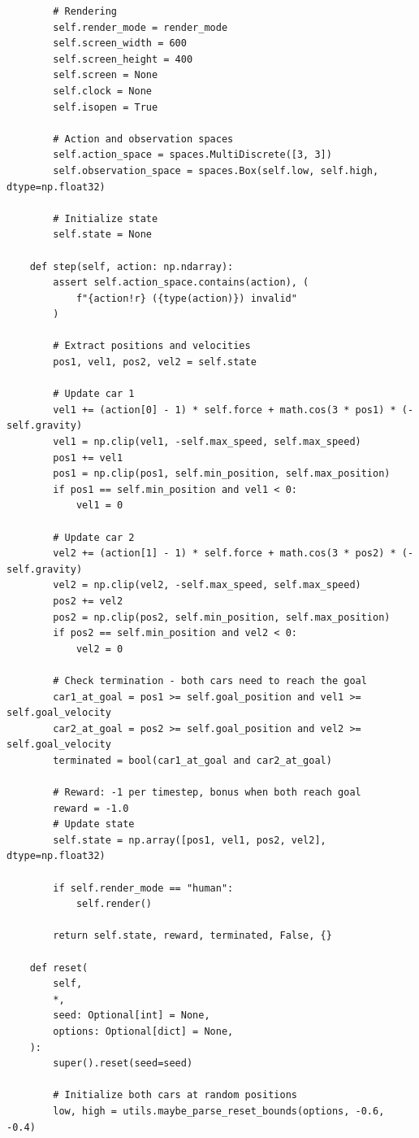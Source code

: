 \documentclass[citestyle=gb7714-2015, bibstyle=gb7714-2015,lang=cn,14pt,scheme=chinese]{elegantbook}
\begin{document}
\begin{verbatim}
        # Rendering
        self.render_mode = render_mode
        self.screen_width = 600
        self.screen_height = 400
        self.screen = None
        self.clock = None
        self.isopen = True

        # Action and observation spaces
        self.action_space = spaces.MultiDiscrete([3, 3])
        self.observation_space = spaces.Box(self.low, self.high, dtype=np.float32)

        # Initialize state
        self.state = None

    def step(self, action: np.ndarray):
        assert self.action_space.contains(action), (
            f"{action!r} ({type(action)}) invalid"
        )

        # Extract positions and velocities
        pos1, vel1, pos2, vel2 = self.state

        # Update car 1
        vel1 += (action[0] - 1) * self.force + math.cos(3 * pos1) * (-self.gravity)
        vel1 = np.clip(vel1, -self.max_speed, self.max_speed)
        pos1 += vel1
        pos1 = np.clip(pos1, self.min_position, self.max_position)
        if pos1 == self.min_position and vel1 < 0:
            vel1 = 0

        # Update car 2
        vel2 += (action[1] - 1) * self.force + math.cos(3 * pos2) * (-self.gravity)
        vel2 = np.clip(vel2, -self.max_speed, self.max_speed)
        pos2 += vel2
        pos2 = np.clip(pos2, self.min_position, self.max_position)
        if pos2 == self.min_position and vel2 < 0:
            vel2 = 0

        # Check termination - both cars need to reach the goal
        car1_at_goal = pos1 >= self.goal_position and vel1 >= self.goal_velocity
        car2_at_goal = pos2 >= self.goal_position and vel2 >= self.goal_velocity
        terminated = bool(car1_at_goal and car2_at_goal)

        # Reward: -1 per timestep, bonus when both reach goal
        reward = -1.0
        # Update state
        self.state = np.array([pos1, vel1, pos2, vel2], dtype=np.float32)

        if self.render_mode == "human":
            self.render()

        return self.state, reward, terminated, False, {}

    def reset(
        self,
        *,
        seed: Optional[int] = None,
        options: Optional[dict] = None,
    ):
        super().reset(seed=seed)

        # Initialize both cars at random positions
        low, high = utils.maybe_parse_reset_bounds(options, -0.6, -0.4)


\end{verbatim}
\end{document}
